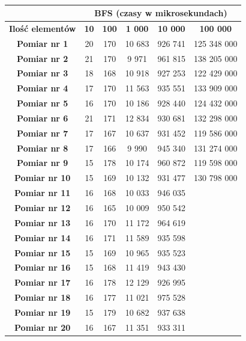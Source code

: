 \documentclass[11pt,a4paper]{article}
\begin{document}
\begin{table}[htbp]
\caption{}
\begin{center}
\begin{tabular}{|c|c|c|c|c|c|}
\hline
\textbf{} & \multicolumn{ 5}{c|}{\textbf{BFS (czasy w mikrosekundach)}} \\ \hline
\textbf{Ilość elementów} & \textbf{10} & \textbf{100} & \textbf{1 000} & \textbf{10 000} & \textbf{100 000} \\ \hline
\textbf{Pomiar nr 1} & 20 & 170 & 10 683 & 926 741 & 125 348 000 \\ \hline
\textbf{Pomiar nr 2} & 21 & 170 & 9 971 & 961 815 & 138 205 000 \\ \hline
\textbf{Pomiar nr 3} & 18 & 168 & 10 918 & 927 253 & 122 429 000 \\ \hline
\textbf{Pomiar nr 4} & 17 & 170 & 11 563 & 935 551 & 133 909 000 \\ \hline
\textbf{Pomiar nr 5} & 16 & 170 & 10 186 & 928 440 & 124 432 000 \\ \hline
\textbf{Pomiar nr 6} & 21 & 171 & 12 834 & 930 681 & 132 298 000 \\ \hline
\textbf{Pomiar nr 7} & 17 & 167 & 10 637 & 931 452 & 119 586 000 \\ \hline
\textbf{Pomiar nr 8} & 17 & 166 & 9 990 & 945 340 & 131 274 000 \\ \hline
\textbf{Pomiar nr 9} & 15 & 178 & 10 174 & 960 872 & 119 598 000 \\ \hline
\textbf{Pomiar nr 10} & 15 & 169 & 10 132 & 931 477 & 130 798 000 \\ \hline
\textbf{Pomiar nr 11} & 16 & 168 & 10 033 & 946 035 &  \\ \hline
\textbf{Pomiar nr 12} & 16 & 165 & 10 009 & 950 542 &  \\ \hline
\textbf{Pomiar nr 13} & 16 & 170 & 11 172 & 964 619 &  \\ \hline
\textbf{Pomiar nr 14} & 16 & 171 & 11 589 & 935 598 &  \\ \hline
\textbf{Pomiar nr 15} & 15 & 169 & 10 965 & 935 523 &  \\ \hline
\textbf{Pomiar nr 16} & 15 & 168 & 11 419 & 943 430 &  \\ \hline
\textbf{Pomiar nr 17} & 16 & 178 & 12 129 & 926 995 &  \\ \hline
\textbf{Pomiar nr 18} & 16 & 177 & 11 021 & 975 528 &  \\ \hline
\textbf{Pomiar nr 19} & 15 & 179 & 10 682 & 937 638 &  \\ \hline
\textbf{Pomiar nr 20} & 16 & 167 & 11 351 & 933 311 &  \\ \hline

\end{tabular}
\end{center}
\end{table}
\end{document}
